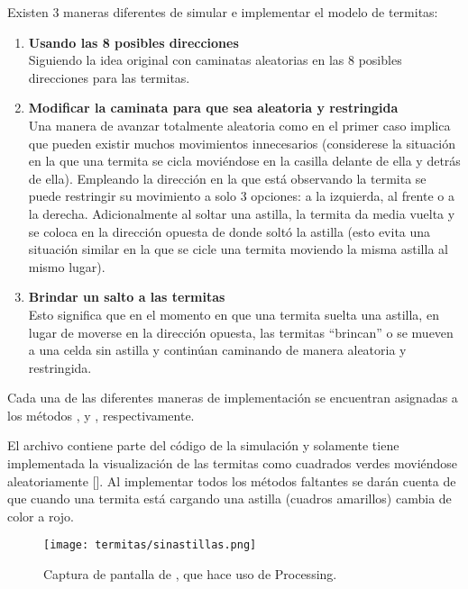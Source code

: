 Existen 3 maneras diferentes de simular e implementar el modelo de termitas:

\begin{enumerate}
  \item \textbf{Usando las 8 posibles direcciones} \\
    Siguiendo la idea original con caminatas aleatorias en las 8 posibles direcciones para las termitas.


  \item \textbf{Modificar la caminata para que sea aleatoria y restringida} \\
    Una manera de avanzar totalmente aleatoria como en el primer caso implica que pueden existir muchos movimientos innecesarios (considerese la situación en la que una termita se cicla moviéndose en la casilla delante de ella y detrás de ella).
    Empleando la dirección en la que está observando la termita se puede restringir su movimiento a solo 3 opciones: a la izquierda, al frente o a la derecha.
    Adicionalmente al soltar una astilla, la termita da media vuelta y se coloca en la dirección opuesta de donde soltó la astilla (esto evita una situación similar en la que se cicle una termita moviendo la misma astilla al mismo lugar).

  \item \textbf{Brindar un salto a las termitas} \\
    Esto significa que en el momento en que una termita suelta una astilla, en lugar de moverse en la dirección opuesta, las termitas “brincan” o se mueven a una celda sin astilla y continúan caminando de manera aleatoria y restringida.
\end{enumerate}

Cada una de las diferentes maneras de implementación se encuentran asignadas a los métodos ,  y , respectivamente.

El archivo  contiene parte del código de la simulación y solamente tiene implementada la visualización de las termitas como cuadrados verdes moviéndose aleatoriamente []. Al implementar todos los métodos faltantes se darán cuenta de que cuando una termita está cargando una astilla (cuadros amarillos) cambia de color a rojo.


\begin{figure}
  \centering
  \texttt{[image: termitas/sinastillas.png]}
  \caption{Captura de pantalla de , que hace uso de Processing.}
  \label{fig:sinastillas}
\end{figure}

